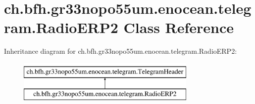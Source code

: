 \hypertarget{classch_1_1bfh_1_1gr33nopo55um_1_1enocean_1_1telegram_1_1_radio_e_r_p2}{}\section{ch.\+bfh.\+gr33nopo55um.\+enocean.\+telegram.\+Radio\+E\+R\+P2 Class Reference}
\label{classch_1_1bfh_1_1gr33nopo55um_1_1enocean_1_1telegram_1_1_radio_e_r_p2}
Inheritance diagram for ch.\+bfh.\+gr33nopo55um.\+enocean.\+telegram.\+Radio\+E\+R\+P2\+:\begin{figure}[H]
\begin{center}
\leavevmode
\includegraphics[height=2.000000cm]{classch_1_1bfh_1_1gr33nopo55um_1_1enocean_1_1telegram_1_1_radio_e_r_p2}
\end{center}
\end{figure}
